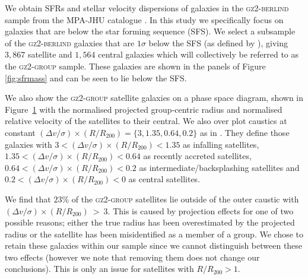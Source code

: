 \documentclass[useAMS,usenatbib]{mn2e}
\begin{document}
We obtain SFRs and stellar velocity dispersions of galaxies in the \textsc{gz2-berlind} sample from the MPA-JHU catalogue \citep{kauffmann03, brinchmann04}. In this study we specifically focus on galaxies that are below the star forming sequence (SFS). We select a subsample of the \textsc{gz2-berlind} galaxies that are $1\sigma$ below the SFS (as defined by \cite{peng10}), giving $3,867$ satellite and $1,564$ central galaxies which will collectively be referred to as the \textsc{gz2-group} sample. These galaxies are shown in the panels of Figure \ref{fig:sfrmass} and can be seen to lie below the SFS.

\begin{figure}
\label{fig:phasespace}
\end{figure}

We also show the \textsc{gz2-group} satellite galaxies on a phase space diagram, shown in Figure~\ref{fig:phasespace} with the normalised projected group-centric radius and normalised relative velocity of the satellites to their central. We also over plot caustics at constant $(\Delta v/\sigma)\times(R/R_{200}) = \{3, 1.35, 0.64, 0.2\}$ as in \cite{noble16}. They define those galaxies with $3<(\Delta v/\sigma)\times(R/R_{200})<1.35$ as infalling satellites, $1.35<(\Delta v/\sigma)\times(R/R_{200})<0.64$ as recently accreted satellites, $0.64<(\Delta v/\sigma)\times(R/R_{200})<0.2$ as intermediate/backsplashing satellites and $0.2<(\Delta v/\sigma)\times(R/R_{200})<0$ as central satellites. 

We find that $23\%$ of the \textsc{gz2-group} satellites lie outside of the outer caustic with $(\Delta v/\sigma)\times(R/R_{200})~>~3$. This is caused by projection effects for one of two possible reasons; either the true radius has been overestimated by the projected radius or the satellite has been misidentified as a member of a group. We chose to retain these galaxies within our sample since we cannot distinguish between these two effects (however we note that removing them does not change our conclusions). This is only an issue for satellites with $R/R_{200} > 1$.
\end{document}
